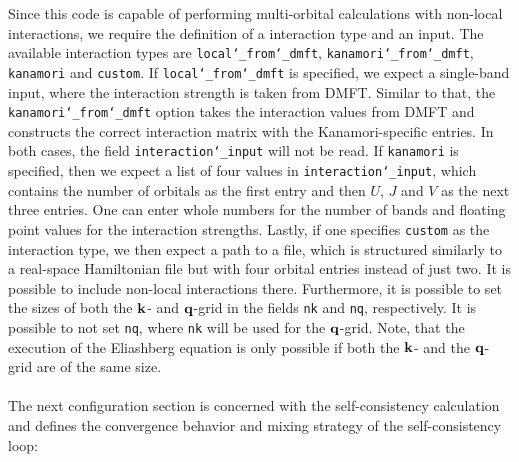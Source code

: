 \documentclass[\main/main.tex]{subfiles}
\begin{document}
Since this code is capable of performing multi-orbital calculations with non-local interactions, we require the definition of a interaction type and an input. The available interaction types are \texttt{local\char`_from\char`_dmft}, \texttt{kanamori\char`_from\char`_dmft}, \texttt{kanamori} and \texttt{custom}. If \texttt{local\char`_from\char`_dmft} is specified, we expect a single-band input, where the interaction strength is taken from DMFT. Similar to that, the \texttt{kanamori\char`_from\char`_dmft} option takes the interaction values from DMFT and constructs the correct interaction matrix with the Kanamori-specific entries. In both cases, the field \texttt{interaction\char`_input} will not be read. If \texttt{kanamori} is specified, then we expect a list of four values in \texttt{interaction\char`_input}, which contains the number of orbitals as the first entry and then $U$, $J$ and $V$ as the next three entries. One can enter whole numbers for the number of bands and floating point values for the interaction strengths. Lastly, if one specifies \texttt{custom} as the interaction type, we then expect a path to a file, which is structured similarly to a real-space Hamiltonian file but with four orbital entries instead of just two. It is possible to include non-local interactions there. Furthermore, it is possible to set the sizes of both the $\textbf{k}$- and $\textbf{q}$-grid in the fields \texttt{nk} and \texttt{nq}, respectively. It is possible to not set \texttt{nq}, where \texttt{nk} will be used for the $\textbf{q}$-grid. Note, that the execution of the Eliashberg equation is only possible if both the $\textbf{k}$- and the $\textbf{q}$-grid are of the same size.
\\\\
The next configuration section is concerned with the self-consistency calculation and defines the convergence behavior and mixing strategy of the self-consistency loop:
\end{document}
